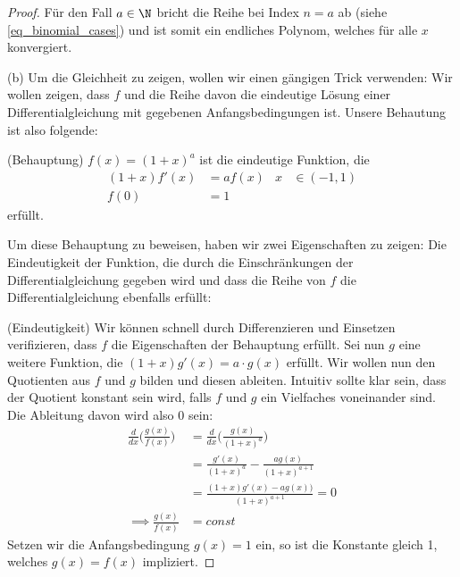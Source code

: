 \begin{example}
\begin{proof}
Für den Fall $a \in \N$ bricht die Reihe bei Index $n = a$ ab (siehe \ref{eq_binomial_cases}) und ist somit ein endliches Polynom, welches für alle $x$ konvergiert.

(b) Um die Gleichheit zu zeigen, wollen wir einen gängigen Trick verwenden: Wir wollen zeigen, dass $f$ und die Reihe davon die eindeutige Lösung einer Differentialgleichung mit gegebenen Anfangsbedingungen ist. Unsere Behautung ist also folgende:

(Behauptung) $f(x) = (1+x)^a$ ist die eindeutige Funktion, die
\begin{align*}
    (1+x)f'(x) &= af(x) & x &\in (-1,1)\\
    f(0) &= 1
\end{align*}
erfüllt.

Um diese Behauptung zu beweisen, haben wir zwei Eigenschaften zu zeigen: Die Eindeutigkeit der Funktion, die durch die Einschränkungen der Differentialgleichung gegeben wird und dass die Reihe von $f$ die Differentialgleichung ebenfalls erfüllt:

(Eindeutigkeit) Wir können schnell durch Differenzieren und Einsetzen verifizieren, dass $f$ die Eigenschaften der Behauptung erfüllt. Sei nun $g$ eine weitere Funktion, die $(1+x)g'(x) = a\cdot g(x)$ erfüllt. Wir wollen nun den Quotienten aus $f$ und $g$ bilden und diesen ableiten. Intuitiv sollte klar sein, dass der Quotient konstant sein wird, falls $f$ und $g$ ein Vielfaches voneinander sind. Die Ableitung davon wird also 0 sein:
\begin{align*}
    \frac{d}{dx} \Big(\frac{g(x)}{f(x)}\Big) &= \frac{d}{dx} \big(\frac{g(x)}{(1+x)^a}\big)\\
    &=\frac{g'(x)}{(1+x)^a}-\frac{ag(x)}{(1+x)^{a+1}}\\
    &= \frac{(1+x)g'(x)-ag(x))}{(1+x)^{a+1}} = 0\\
    \implies \frac{g(x)}{f(x)} &= const
\end{align*}
Setzen wir die Anfangsbedingung $g(x) = 1$ ein, so ist die Konstante gleich 1, welches $g(x) = f(x)$ impliziert.


\end{proof}
\end{example}
